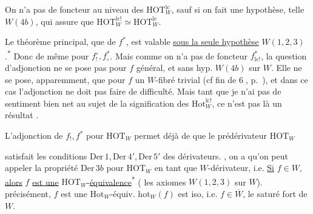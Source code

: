 On n'a pas de foncteur  au niveau des $\mathrm{HOT}^{\mathrm{lc}}_W$, sauf si on fait une hypothèse, telle \uline{$W(4b)$}, qui assure que $\mathrm{HOT}^{\mathrm{lc}!}_W\simeq\mathrm{HOT}^{\mathrm{lc}}_W$.

Le théorème principal, que     de $f^*$, est valable \uline{sous la seule hypothèse} $W(1,2,3)$.\textsuperscript{*}
Donc de même pour $f_!^\circ,f_\circ^*$. Mais comme on n'a pas de foncteur  $f^*_{\mathrm{lc}!}$, la question d'adjonction ne se pose pas pour $f$ général, et sans hyp. $W(4b)$ sur $W$. Elle ne se pose, apparemment, que pour $f$ un $W$-fibré trivial (cf fin de \textcircled{6}, p.~), et dans ce cas l'adjonction ne doit pas faire de difficulté. Mais tant que je n'ai pas de sentiment bien net au sujet de la signification des $\mathrm{Hot}^{\mathrm{lc}!}_W$, ce n'est pas là un résultat  .

L'adjonction de $f_!,f^*$ pour $\mathrm{HOT}_W$ permet déjà de  que le prédérivateur $\mathrm{HOT}_W$

satisfait les conditions $\mathrm{Der}\,1,\mathrm{Der}\,4',\mathrm{Der}\,5'$ des dérivateurs.  , on a  qu'on peut appeler la propriété $\mathrm{Der}\,3b$ pour $\mathrm{HOT}_W$ en tant que $W$-dérivateur, i.e. \uline{Si} $f\in W$, \uline{alors} $f$ \uline{est une} $\mathrm{HOT}_W$-\uline{équivalence}\textsuperscript{*}
( les  axiomes $W(1,2,3)$ sur $W$).   précisément, $f$ est une $\mathrm{Hot}_W$-équiv.  $\mathrm{hot}_W(f)$ est iso, i.e. $f\in\overline{W}$, le saturé fort de $W$.

